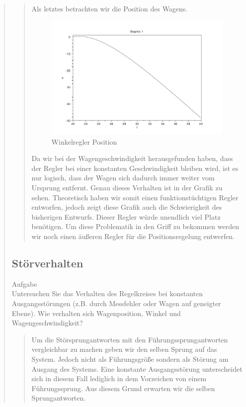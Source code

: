 \begin{quote}
\begin{quote}
        Als letztes betrachten wir die Position des Wagens.

        \begin{figure}[H]
        \centering
            \includegraphics[scale=0.7, trim = 0cm 0cm 0cm 0cm, clip]{./Bilder/Winkelregler_Position}
                \caption{Winkelregler Position}
                \label{Winkelregler_Position}
        \end{figure}
        
        Da wir bei der Wagengeschwindigkeit herausgefunden haben, dass der Regler bei einer konstanten Geschwindigkeit
        bleiben wird, ist es nur logisch, dass der Wagen sich dadurch immer weiter vom Ursprung entfernt.
        Genau dieses Verhalten ist in der Grafik zu sehen. Theoretisch haben wir somit einen funktionstüchtigen Regler
        entworfen, jedoch zeigt diese Grafik auch die Schwierigkeit des bisherigen Entwurfs. Dieser Regler würde unendlich
        viel Platz benötigen. Um diese Problematik in den Griff zu bekommen werden wir noch einen äußeren Regler für die
        Positionsregelung entwerfen.
        
        
    \end{quote}  %
    
    \subsection{Störverhalten}
    Aufgabe\\
    Untersuchen Sie das Verhalten des Regelkreises bei konstanten Ausgangsstörungen (z.B. durch Messfehler oder Wagen
    auf geneigter Ebene). Wie verhalten sich Wagenposition, Winkel und Wagengeschwindigkeit?
    \begin{quote}
        Um die Störsprungantworten mit den Führungssprungantworten vergleichbar zu machen geben wir den selben Sprung auf das
        System. Jedoch nicht als Führungsgröße sondern als Störung am Ausgang des Systems. Eine konstante Ausgangsstörung
        unterscheidet sich in diesem Fall lediglich in dem Vorzeichen von einem Führungssprung. Aus diesem Grund erwarten wir die
        selben Sprungantworten.
        

\end{quote}
\end{quote}
